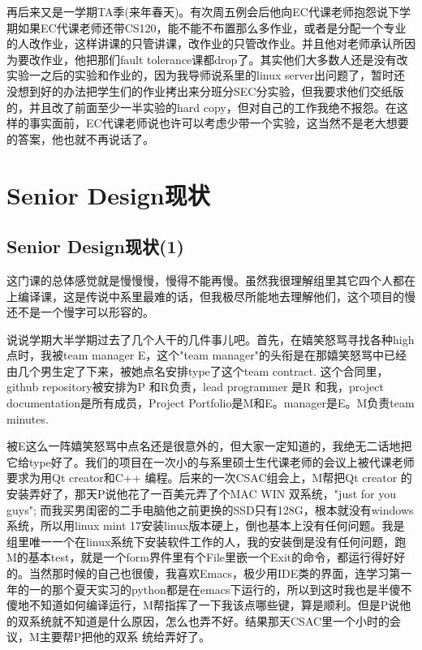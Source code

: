\documentclass[12pt]{book}
\begin{document}
再后来又是一学期TA季(来年春天)。有次周五例会后他向EC代课老师抱怨说下学期如果EC代课老师还带CS120，能不能不布置那么多作业，或者是分配一个专业的人改作业，这样讲课的只管讲课，改作业的只管改作业。并且他对老师承认所因为要改作业，他把那们fault tolerance课都drop了。其实他们大多数人还是没有改实验一之后的实验和作业的，因为我导师说系里的linux server出问题了，暂时还没想到好的办法把学生们的作业拷出来分班分SEC分实验，但我要求他们交纸版的，并且改了前面至少一半实验的hard copy，但对自己的工作我绝不报怨。在这样的事实面前，EC代课老师说也许可以考虑少带一个实验，这当然不是老大想要的答案，他也就不再说话了。

\chapter{Senior Design现状}
\label{sec-21}
\section{Senior Design现状(1)}
\label{sec-21-1}
这门课的总体感觉就是慢慢慢，慢得不能再慢。虽然我很理解组里其它四个人都在上编译课，这是传说中系里最难的话，但我极尽所能地去理解他们，这个项目的慢还不是一个慢字可以形容的。 

说说学期大半学期过去了几个人干的几件事儿吧。首先，在嬉笑怒骂寻找各种high点时，我被team manager E，这个"team manager"的头衔是在那嬉笑怒骂中已经由几个男生定了下来，被她点名安排type了这个team contract. 这个合同里，github repository被安排为P 和R负责，lead programmer 是R 和我，project documentation是所有成员，Project Portfolio是M和E。manager是E。M负责team minutes.

被E这么一阵嬉笑怒骂中点名还是很意外的，但大家一定知道的，我绝无二话地把它给type好了。我们的项目在一次小的与系里硕士生代课老师的会议上被代课老师要求为用Qt creator和C++ 编程。后来的一次CSAC组会上，M帮把Qt creator 的安装弄好了，那天P说他花了一百美元弄了个MAC WIN 双系统，"just for you guys"; 而我买男闺密的二手电脑他之前更换的SSD只有128G，根本就没有windows系统，所以用linux mint 17安装linux版本硬上，倒也基本上没有任何问题。我是组里唯一一个在linux系统下安装软件工作的人，我的安装倒是没有任何问题，跑M的基本test，就是一个form界件里有个File里嵌一个Exit的命令，都运行得好好的。当然那时候的自己也很傻，我喜欢Emacs，极少用IDE类的界面，连学习第一年的一的那个夏天实习的python都是在emacs下运行的，所以到这时我也是半傻不傻地不知道如何编译运行，M帮指挥了一下我该点哪些键，算是顺利。但是P说他的双系统就不知道是什么原因，怎么也弄不好。结果那天CSAC里一个小时的会议，M主要帮P把他的双系 统给弄好了。
\end{document}
